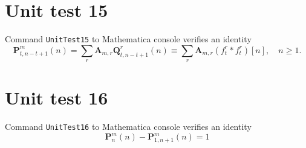 \documentclass[12pt, letterpaper]{amsart}
\theoremstyle{definition}
\theoremstyle{remark}
\numberwithin{equation}{section}
\begin{document}
\section*{Unit test 15}
Command \verb"UnitTest15" to Mathematica console verifies an identity
\begin{equation*}
\mathbf{P}^{m}_{t,n-t+1}(n)
=\sum\limits_{r}\mathbf{A}_{m,r} \mathbf{Q}_{t,n-t+1}^r(n)
\equiv \sum\limits_{r}\mathbf{A}_{m,r} (f_{t}^{r} \ast f_{t}^{r})[n], \quad n\geq 1.
\end{equation*}
\section*{Unit test 16}
Command \verb"UnitTest16" to Mathematica console verifies an identity
\begin{equation*}
\mathbf{P}^{m}_{n}(n) - \mathbf{P}^{m}_{1,n+1}(n) = 1
\end{equation*}
\end{document}
